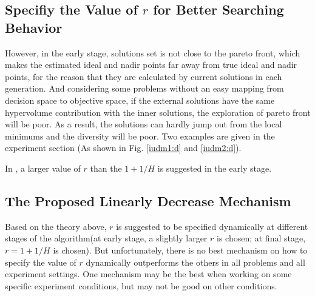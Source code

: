 \documentclass[conference]{IEEEtran}
\begin{document}
%
% 
\subsection{Specifiy the Value of $r$ for Better Searching Behavior}
However, in the early stage, solutions set is not close to the pareto front, which makes the 
estimated ideal and nadir points far away from true ideal and nadir points, for the reason that
they are calculated by current solutions in each generation. 
And considering some problems without an easy mapping from decision space to objective space,
if the external solutions have the same hypervolume contribution with the inner solutions,
the exploration of pareto front will be poor. 
As a result, the solutions can hardly jump out from the local minimums and the diversity will be poor.
Two examples are given in the experiment section (As shown in Fig. \ref{iudm1:d} and \ref{iudm2:d}). 

In \cite{hisao:dynamic}, a larger value of $r$ than the $1+1/H$ is suggested in the early stage.

% 
\subsection{The Proposed Linearly Decrease Mechanism}
Based on the theory above, $r$ is suggested to be specified dynamically at different stages of
the algorithm(at early stage, a slightly larger $r$ is chosen; at final stage, $r=1+1/H$ is chosen).
But unfortunately, there is no best mechanism on how to specify the value of $r$ dynamically
outperforms the others in all problems and all experiment settings. One mechanism may be the best
when working on some specific experiment conditions, but may not be good on other conditions. 
\end{document}
